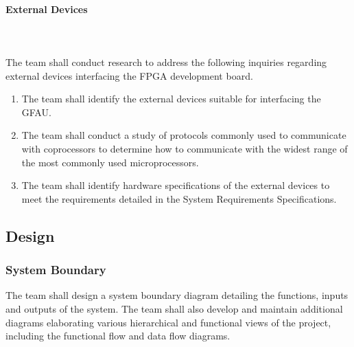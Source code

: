 \documentclass[12pt]{extarticle}
\begin{document}

                \paragraph{External Devices} \leavevmode \\~\\ The team shall
                conduct research to address the following inquiries regarding
                external devices interfacing the FPGA development board.

                \begin{enumerate}
                    \item The team shall identify the external devices suitable
                    for interfacing the GFAU.
                    \item The team shall conduct a study of protocols commonly
                    used to communicate with coprocessors to determine how to
                    communicate with the widest range of the most commonly used
                    microprocessors.
                    \item The team shall identify hardware specifications of the
                    external devices to meet the requirements detailed in the
                    System Requirements Specifications.
                \end{enumerate}


        \subsection{Design}

            \subsubsection{System Boundary} The team shall design a system
            boundary diagram detailing the functions, inputs and outputs of the
            system. The team shall also develop and maintain additional
            diagrams elaborating various hierarchical and functional views of
            the project, including the functional flow and data flow diagrams.
\end{document}
